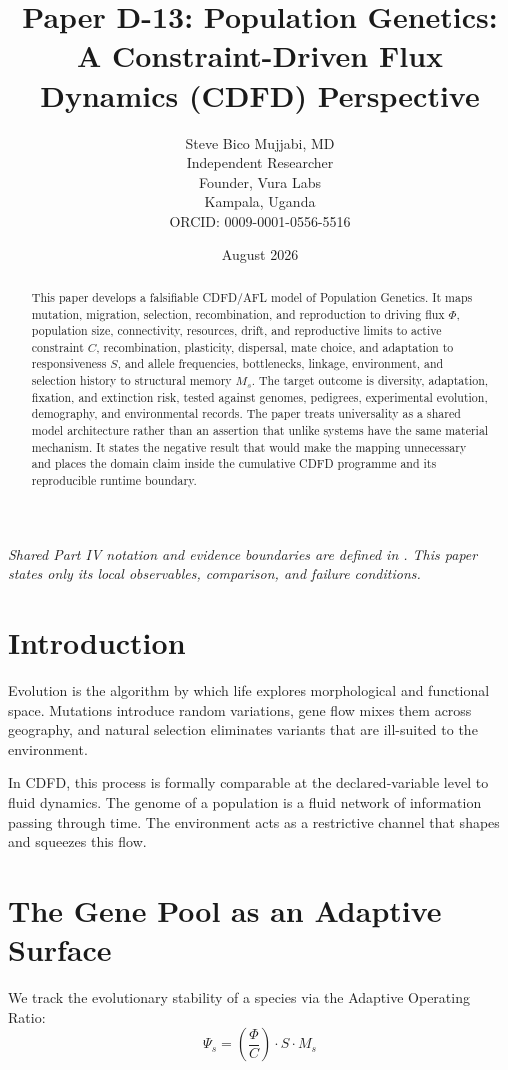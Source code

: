 \documentclass[11pt,a4paper]{article}
\title{\textbf{Paper D-13: Population Genetics:\\ A Constraint-Driven Flux Dynamics (CDFD) Perspective}}
\author{Steve Bico Mujjabi, MD\\
\small Independent Researcher\\
\small Founder, Vura Labs\\
\small Kampala, Uganda\\
\small ORCID: 0009-0001-0556-5516}
\date{August 2026}
\begin{document}
\maketitle

\noindent\textit{Shared Part IV notation and evidence boundaries are defined in . This paper states only its local observables, comparison, and failure conditions.}


\begin{abstract}
This paper develops a falsifiable CDFD/AFL model of Population Genetics. It maps mutation, migration, selection, recombination, and reproduction to driving flux $\Phi$, population size, connectivity, resources, drift, and reproductive limits to active constraint $C$, recombination, plasticity, dispersal, mate choice, and adaptation to responsiveness $S$, and allele frequencies, bottlenecks, linkage, environment, and selection history to structural memory $M_s$. The target outcome is diversity, adaptation, fixation, and extinction risk, tested against genomes, pedigrees, experimental evolution, demography, and environmental records. The paper treats universality as a shared model architecture rather than an assertion that unlike systems have the same material mechanism. It states the negative result that would make the mapping unnecessary and places the domain claim inside the cumulative CDFD programme and its reproducible runtime boundary.
\end{abstract}

\section{Introduction}

Evolution is the algorithm by which life explores morphological and functional space. Mutations introduce random variations, gene flow mixes them across geography, and natural selection eliminates variants that are ill-suited to the environment.

In CDFD, this process is formally comparable at the declared-variable level to fluid dynamics. The genome of a population is a fluid network of information passing through time. The environment acts as a restrictive channel that shapes and squeezes this flow.

\section{The Gene Pool as an Adaptive Surface}
We track the evolutionary stability of a species via the Adaptive Operating Ratio:
\begin{equation}
    \Psi_s = \left( \frac{\Phi}{C} \right) \cdot S \cdot M_s
\end{equation}
\end{document}
